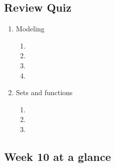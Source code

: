 \newpage
\subsection*{Review Quiz}
\begin{enumerate}
\item Modeling
\begin{enumerate}
    \item {}
    \item {}
    \item {}
    \item {}
\end{enumerate}
\item Sets and functions
\begin{enumerate}
    \item {}
    \item {}
    \item {}
\end{enumerate}

\end{enumerate}

\newpage

\subsection*{Week 10 at a glance}

